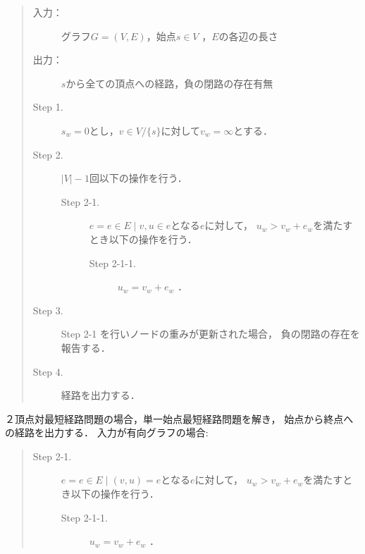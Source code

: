 \documentclass[12pt]{optlab-bachelor}
\begin{document}
\begin{itemize}
  \begin{quote}
    \begin{description}
      \item[入力：] グラフ$G=(V,E)$，始点$s \in V$ ，$E$の各辺の長さ
      \item[出力：] $s$から全ての頂点への経路，負の閉路の存在有無
      \item[Step 1.] $s_w = 0$とし，$v \in V/\{s\}$に対して$v_w = \infty$とする．
      \item[Step 2.] $|V|-1$回以下の操作を行う．
      \begin{description}
        \item[Step 2-1.] $e = {e \in E \mid v,u \in e}$となる$e$に対して，
        $u_w > v_w + e_w$を満たすとき以下の操作を行う．
        \begin{description}
          \item[Step 2-1-1.] $u_w = v_w + e_w$ ．
        \end{description}
      \end{description}
      \item[Step 3.] Step 2-1 を行いノードの重みが更新された場合，
      負の閉路の存在を報告する．
      \item[Step 4.] 経路を出力する．
    \end{description}
  \end{quote}
  ２頂点対最短経路問題の場合，単一始点最短経路問題を解き，
  始点から終点への経路を出力する．
  入力が有向グラフの場合:
  \begin{quote}
    \begin{description}
      \item[Step 2-1.] $e = {e \in E \mid (v,u) = e}$となる$e$に対して，
      $u_w > v_w + e_w$を満たすとき以下の操作を行う．
      \begin{description}
        \item[Step 2-1-1.] $u_w = v_w + e_w$ ．
      \end{description}
    \end{description}
  \end{quote}
\end{itemize}
\end{document}
